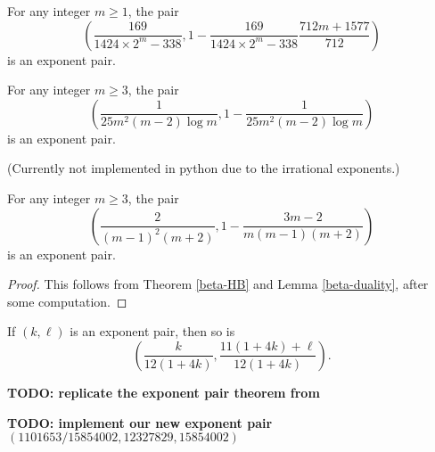 \literature
{}


\begin{theorem}\cite[Table 17.3]{huxley_area_1996}  For any integer $m \geq 1$, the pair
    $$ \left(\frac{169}{1424 \times 2^m - 338}, 1 - \frac{169}{1424 \times 2^m - 338} \frac{712m+1577}{712}\right)$$
is an exponent pair.
\end{theorem}

\literature
{}

\begin{theorem}\cite[(6.17.4)]{titchmarsh_theory_1986}  For any integer $m \geq 3$, the pair
$$ \left(\frac{1}{25m^2 (m-2) \log m}, 1 - \frac{1}{25 m^2 (m-2) \log m}\right)$$
is an exponent pair.
\end{theorem}

(Currently not implemented in python due to the irrational exponents.)

\begin{theorem}\cite[Theorem 2]{heathbrown_new_2017}
For any integer $m \geq 3$, the pair
$$ \left(\frac{2}{(m-1)^2(m+2)}, 1 - \frac{3m-2}{m(m-1)(m+2)}\right)$$
is an exponent pair.
\end{theorem}

\literature
{}

\begin{proof} This follows from Theorem \ref{beta-HB} and Lemma \ref{beta-duality}, after some computation.
\end{proof}


\begin{theorem}\cite[Theorem 5]{sargos_analog_2003}  If $(k,\ell)$ is an exponent pair, then so is
    $$ \left(\frac{k}{12(1+4k)}, \frac{11(1+4k)+\ell}{12(1+4k)}\right).$$
\end{theorem}

\literature
{}

{\bf TODO: replicate the exponent pair theorem from \cite{trudgian-yang}}

{\bf TODO: implement our new exponent pair $(1101653/15854002, 12327829,15854002)$}
